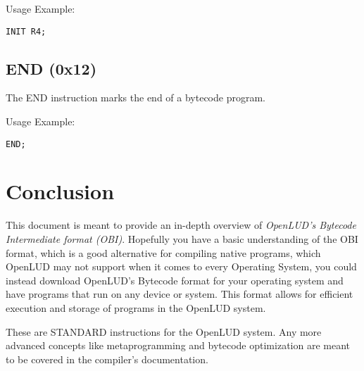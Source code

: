 \documentclass{article}
\begin{document}
Usage Example:
\begin{verbatim}
INIT R4;
\end{verbatim}

\subsection{END (0x12)}
The END instruction marks the end of a bytecode program.

Usage Example:
\begin{verbatim}
END;
\end{verbatim}

\section{Conclusion}
This document is meant to provide an in-depth overview of \emph{OpenLUD's Bytecode Intermediate
format (OBI)}. Hopefully you have a basic understanding of the OBI format, which
is a good alternative for compiling native programs, which OpenLUD may not
support when it comes to every Operating System, you could instead download
OpenLUD's Bytecode format for your operating system and have programs that run
on any device or system. This format allows for efficient execution and storage of programs in the OpenLUD system.

These are STANDARD instructions for the OpenLUD system. Any more advanced
concepts like metaprogramming and bytecode optimization are meant to be covered in
the compiler's documentation.
\end{document}
